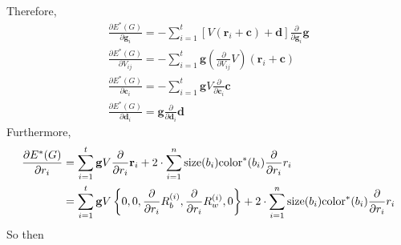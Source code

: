\documentclass{amsart}
\def\v#1{\mathbf{#1}}
\begin{document}
Therefore,
\begin{gather*}
\frac{ \partial E^*(G) }{ \partial \v{ g }_i }
  = -\sum_{ i = 1 }^t [V(\v{ r }_i + \v{ c }) + \v{ d }] \frac{ \partial }{ \partial \v{ g }_i } \v{ g }\\
\frac{ \partial E^*(G) }{ \partial V_{ i j } }
  = -\sum_{ i = 1 }^t \v{ g } \left(\frac{ \partial }{ \partial V_{ i j } } V\right)(\v{ r }_i + \v{ c })\\
\frac{ \partial E^*(G) }{ \partial \v{ c }_i }
  = - \sum_{ i = 1 }^t \v{ g } V \frac{ \partial }{ \partial \v{ c }_i } \v{ c }\\
\frac{ \partial E^*(G) }{ \partial \v{ d }_i } = \v{ g } \frac{ \partial }{ \partial \v{ d }_i } \v{ d }
\end{gather*}
Furthermore,
\begin{align*}
\frac{ \partial E^*(G) }{ \partial r_i }
  &= \sum_{ i = 1 }^t \v{ g } V \frac{ \partial }{ \partial r_i } \v{ r }_i
  + 2 \cdot \sum_{ i = 1 }^n \size{ b_i } \colorp{ b_i } \frac{ \partial }{ \partial r_i }  r_i\\
  &= \sum_{ i = 1 }^t \v{ g } V \left\{ 0, 0, \frac{ \partial }{ \partial r_i } R_b^{ (i) }, \frac{ \partial }{ \partial r_i } R_w^{ (i) }, 0 \right\}
  + 2 \cdot \sum_{ i = 1 }^n \size{ b_i } \colorp{ b_i } \frac{ \partial }{ \partial r_i }  r_i
\end{align*}
So then
\end{document}
